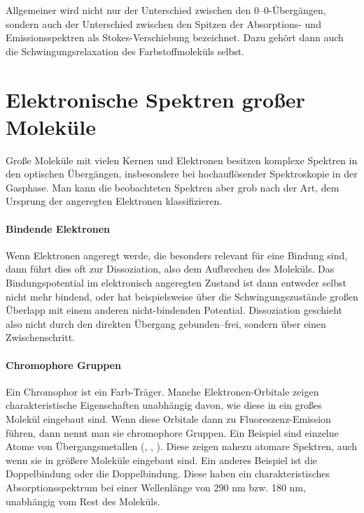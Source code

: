 Allgemeiner  wird nicht nur der Unterschied zwischen den 0--0-Übergängen, sondern auch der Unterschied zwischen den Spitzen der Absorptions- und Emissionsspektren als Stokes-Verschiebung bezeichnet. Dazu gehört dann auch die Schwingungsrelaxation des Farbstoffmoleküls selbst.



\section{Elektronische Spektren großer Moleküle}

Große Moleküle mit vielen Kernen und Elektronen besitzen komplexe Spektren in den optischen Übergängen, insbesondere bei hochauflösender Spektroskopie in der Gasphase. Man kann die beobachteten Spektren aber grob nach der Art, dem Ursprung der angeregten Elektronen klassifizieren.

\paragraph{Bindende Elektronen} Wenn Elektronen angeregt werde, die besonders relevant für eine Bindung sind, dann führt dies oft zur Dissoziation, also dem Aufbrechen des Moleküls. Das Bindungspotential im elektronisch angeregten Zustand ist dann entweder selbst nicht mehr bindend, oder hat beispielsweise über die Schwingungszustände großen Überlapp mit einem anderen nicht-bindenden Potential. Dissoziation geschieht also nicht durch den direkten Übergang gebunden--frei, sondern über einen Zwischenschritt.

\paragraph{Chromophore Gruppen} Ein Chromophor ist ein Farb-Träger. Manche Elektronen-Orbitale zeigen charakteristische Eigenschaften unabhängig davon, wie diese in ein großes Molekül eingebaut sind. Wenn diese Orbitale dann zu Fluoreszenz-Emission führen, dann nennt man sie chromophore Gruppen. Ein Beispiel sind einzelne Atome von Übergangsmetallen (, , ). Diese zeigen nahezu atomare Spektren, auch wenn sie in größere Moleküle eingebaut sind. Ein anderes Beispiel ist die  Doppelbindung oder die  Doppelbindung. Diese haben ein charakteristisches Absorptionsspektrum bei einer Wellenlänge von 290 nm bzw. 180 nm, unabhängig vom Rest des Moleküls.

